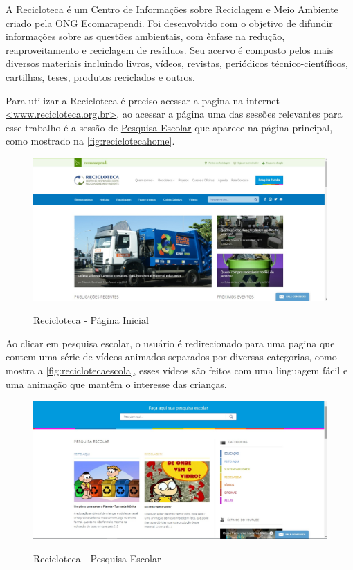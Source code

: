 \documentclass[
	12pt,				%
	openright,			%
	twoside,			%
	a4paper,			%
	english,			%
	french,				%
	spanish,			%
	brazil				%
	]{abntex2}
\begin{document}
A Recicloteca é um Centro de Informações sobre Reciclagem e Meio Ambiente criado pela ONG Ecomarapendi. Foi desenvolvido com o objetivo de difundir informações sobre as questões ambientais, com ênfase na redução, reaproveitamento e reciclagem de resíduos. Seu acervo é composto pelos mais diversos materiais incluindo livros, vídeos, revistas, periódicos técnico-científicos, cartilhas, teses, produtos reciclados e outros.

Para utilizar a Recicloteca é preciso acessar a pagina na internet \href{http://www.recicloteca.org.br/}{<www.recicloteca.org.br>}, ao acessar a página uma das sessões relevantes para esse trabalho é a sessão de \href{http://www.recicloteca.org.br/pesquisa/}{Pesquisa Escolar} que aparece na página principal, como mostrado na \autoref{fig:reciclotecahome}.

\begin{figure}[h]
\centering
   \caption{Recicloteca - Página Inicial}
   \includegraphics[scale=0.45]{media/reciclotecahome.jpg}
     \label{fig:reciclotecahome}
\end{figure}

\newpage
Ao clicar em pesquisa escolar, o usuário é redirecionado para uma pagina que contem uma série de vídeos animados separados por diversas categorias, como mostra a \autoref{fig:reciclotecaescola}, esses vídeos são feitos com uma linguagem fácil e uma animação que mantêm o interesse das crianças.


\begin{figure}[h]
\centering
   \caption{Recicloteca - Pesquisa Escolar}
   \includegraphics[scale=0.45]{media/reciclotecaescola.jpg}
     \label{fig:reciclotecaescola}
\end{figure}
\end{document}
